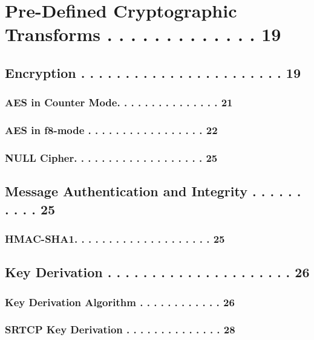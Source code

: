 \documentclass{article}
\begin{document}
\section{Pre-Defined Cryptographic Transforms . . . . . . . . . . . . . 19}

\subsection{Encryption . . . . . . . . . . . . . . . . . . . . . . . 19}

\subsubsection{AES in Counter Mode. . . . . . . . . . . . . . . 21}

\subsubsection{AES in f8-mode . . . . . . . . . . . . . . . . . 22}

\subsubsection{NULL Cipher. . . . . . . . . . . . . . . . . . . 25}

\subsection{Message Authentication and Integrity . . . . . . . . . . 25}

\subsubsection{HMAC-SHA1. . . . . . . . . . . . . . . . . . . . 25}

\subsection{Key Derivation . . . . . . . . . . . . . . . . . . . . . 26}

\subsubsection{Key Derivation Algorithm . . . . . . . . . . . . 26}

\subsubsection{SRTCP Key Derivation . . . . . . . . . . . . . . 28}
\end{document}
